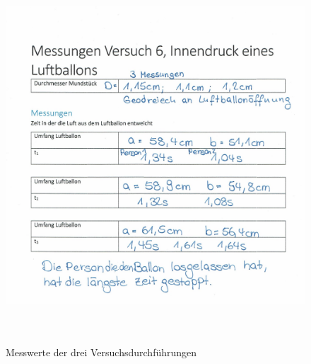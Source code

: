 \documentclass{article}
\begin{document}
    \begin{figure}[!h]\label{fig:Messwerte}
        \centering
        \includegraphics[height=14cm]{messwerte.jpg}
        \caption{Messwerte der drei Versuchsdurchführungen}
    \end{figure}

    
\end{document}
